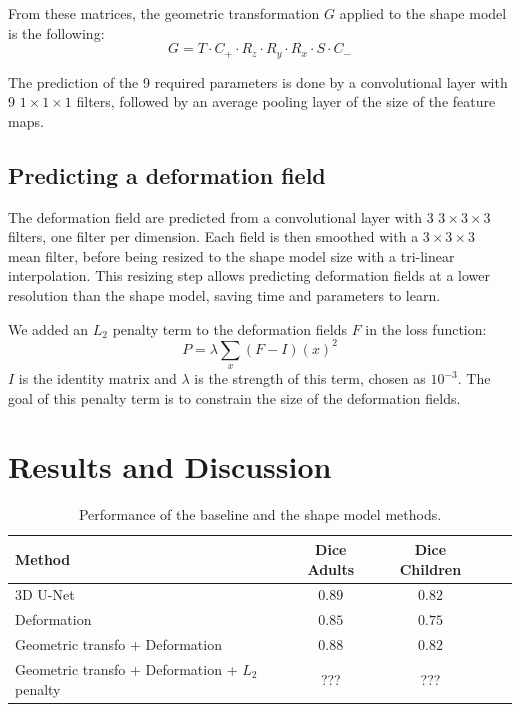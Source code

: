 From these matrices, the geometric transformation $G$ applied to the shape model is the following:
\begin{equation}
    G = T \cdot C_+ \cdot R_z \cdot R_y \cdot R_x \cdot S \cdot C_-
\end{equation}

The prediction of the 9 required parameters is done by a convolutional layer with 9 $1 \times 1 \times 1$ filters, followed by an average pooling layer of the size of the feature maps. 

\subsection{Predicting a deformation field}

The deformation field are predicted from a convolutional layer with 3 $3 \times 3 \times 3$ filters, one filter per dimension. Each field is then smoothed with a $3 \times 3 \times 3$ mean filter, before being resized to the shape model size with a tri-linear interpolation. This resizing step allows predicting deformation fields at a lower resolution than the shape model, saving time and parameters to learn.

We added an $L_2$ penalty term to the deformation fields $F$ in the loss function:
\begin{equation}
    P = \lambda \sum_x \left( F - I \right)(x)^2
\end{equation}
$I$ is the identity matrix and $\lambda$ is the strength of this term, chosen as $10^{-3}$. The goal of this penalty term is to constrain the size of the deformation fields.



\section{Results and Discussion}
\label{sec:seg_result}

\begin{table}[htbp]
	\centering
\begin{tabular}{|l|c|c|c|c|}
	\hline
    Method & Dice Adults & Dice Children \\
	\hline
    3D U-Net & $\bm{0.89}$ & $\bm{0.82}$ \\
    Deformation & $0.85$ & $0.75$ \\
    Geometric transfo + Deformation & $0.88$ & $\bm{0.82}$ \\
    Geometric transfo + Deformation + $L_2$ penalty & ??? & ??? \\
    \hline
\end{tabular}
	\vspace{2mm}
	\caption{Performance of the baseline and the shape model methods.}
    \label{table:seg_results}
\end{table}

